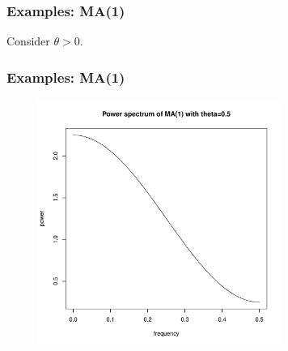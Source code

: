 \documentclass[%
xcolor=pdftex]{beamer}
\begin{document}







\begin{frame}
\frametitle{Examples: MA(1)}

Consider $\theta>0$.

\vspace{50mm}

\end{frame}

\begin{frame}
\frametitle{Examples: MA(1)}

\includegraphics[width=100mm, height=80mm]{ma1_1power.pdf}

\end{frame}





\end{document}
